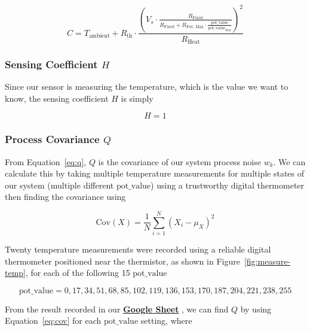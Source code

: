 \documentclass[12pt,a4paper]{article}
\begin{document}
\begin{equation*}
    C = T_{\text{ambient}} + R_{\text{th}} \cdot \frac{\left(V_s \cdot \frac{R_{\text{Fixed}}}{R_{\text{Fixed}} + R_{\text{Pot, Max}} \cdot \frac{\text{pot\_value}}{\text{pot\_value}_{\text{Max}}}}\right)^2}{R_{\text{Heat}}}
\end{equation*}

\subsubsection{Sensing Coefficient $H$}
Since our sensor is measuring the temperature, which is the value we want to know, the sensing coefficient $H$ is simply

\begin{equation*}
    H = 1
\end{equation*}

\subsubsection{Process Covariance $Q$}
From Equation~\eqref{eq:q}, $Q$ is the covariance of our system process noise $w_k$. We can calculate this by taking multiple temperature measurements for multiple states of our system (multiple different $\text{pot\_value}$) using a trustworthy digital thermometer then finding the covariance using


\begin{equation}
    \label{eq:cov}
    \mathrm{Cov}(X) = \frac{1}{N} \sum_{i=1}^{N} (X_i - \mu_X)^2
\end{equation}

Twenty temperature measurements were recorded using a reliable digital thermometer positioned near the thermistor, as shown in Figure~\ref{fig:measure-temp}, for each of the following 15 $\text{pot\_value}$

\begin{equation}
    \label{eq:pot-value}
    \text{pot\_value} = 0, 17, 34, 51, 68, 85, 102, 119, 136, 153, 170, 187, 204, 221, 238, 255
\end{equation}

From the result recorded in our \href{https://docs.google.com/spreadsheets/d/1mIqAQL7zom7rqrgY63SVOOFBYus10Tk0CKpmR08Oij0/edit?gid=0#gid=0}{\textbf{\underline{Google Sheet}}}
, we can find $Q$ by using Equation~\eqref{eq:cov} for each $\text{pot\_value}$ setting, where 
\end{document}
